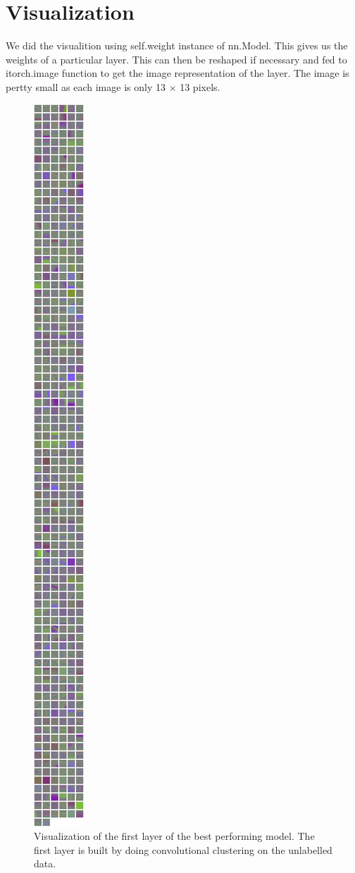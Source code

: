 \documentclass{article}
\begin{document}
\section{Visualization}
We did the visualition using self.weight instance of nn.Model.  This gives us the weights of a particular layer.  This can then be reshaped if necessary and fed to itorch.image function to get the image representation of the layer.  The image is pertty small as each image is only 13 $\times{}$ 13 pixels.
\begin{figure}[ht!]
  \centering
  \includegraphics[height=\textheight]{images/centroids}
  \caption{Visualization of the first layer of the best performing model.  The first layer is built by doing convolutional clustering on the unlabelled data.}
\end{figure}
\end{document}
